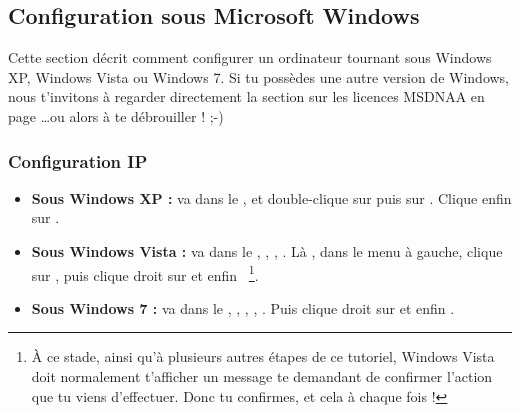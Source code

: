 



\subsection{Configuration sous Microsoft Windows}


Cette section d\'ecrit comment configurer un ordinateur tournant sous Windows XP, Windows Vista ou Windows 7. Si tu poss\`edes une autre version de Windows,
nous t'invitons \`a  regarder directement la section sur les licences MSDNAA en page \pageref{msdnaa}\dots ou alors \`a  te d\'ebrouiller ! ;-)

\subsubsection{Configuration IP}

\begin{itemize}

\item \textbf{Sous Windows XP :} va dans le ,  et double-clique sur  puis sur . Clique enfin sur .

\item \textbf{Sous Windows Vista :} va dans le , , , . L\`a , dans le menu \`a  gauche, clique sur , puis clique droit sur  et enfin  ~\footnote{\`A ce stade, ainsi qu'\`a  plusieurs autres \'etapes de ce tutoriel, Windows Vista doit normalement t'afficher un message te demandant de confirmer l'action que tu viens d'effectuer. Donc tu confirmes, et cela \`a  chaque fois !}.

\item \textbf{Sous Windows 7 :} va dans le , , , , . Puis clique droit sur  et enfin  .

\end{itemize}



